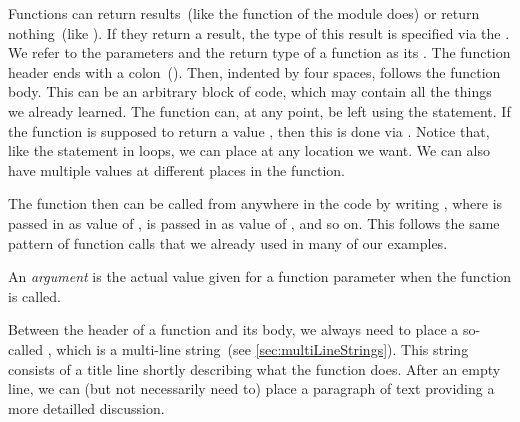 Functions can return results~(like the  function of the  module does) or return nothing~(like ).
If they return a result, the type of this result is specified via the  \pythonIdx{->}.
We refer to the parameters and the return type of a function as its .
The function header ends with a colon~(\pythonilIdx{:}).%
%
%
%
Then, indented by four spaces, follows the function body.%
%
%
%
This can be an arbitrary block of code, which may contain all the things we already learned.
The function can, at any point, be left using the  statement.
If the function is supposed to return a value , then this is done via .
Notice that, like the  statement in loops, we can place  at any location we want.
We can also have multiple  values at different places in the function.%
%
\begin{sloppypar}%
The function  then can be called from anywhere in the code by writing , where  is passed in as value of ,  is passed in as value of , and so on.
This follows the same pattern of function calls that we already used in many of our examples.%
\end{sloppypar}%
%
\begin{definition}[Argument]%
An \emph{argument} is the actual value given for a function parameter when the function is called.%
\end{definition}%
%
%
Between the header of a function and its body, we always need to place a so-called , which is a multi-line string~(see \cref{sec:multiLineStrings}).
This string consists of a title line shortly describing what the function does.
After an empty line, we can (but not necessarily need to) place a paragraph of text providing a more detailled discussion.

